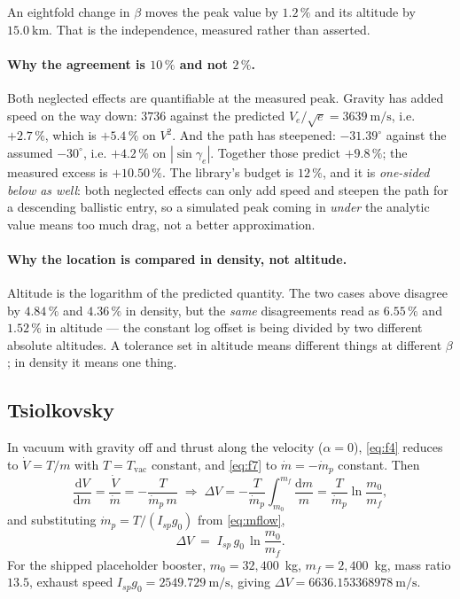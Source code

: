 \documentclass[11pt]{article}
\newcommand{\dd}{\mathrm{d}}
\begin{document}
An eightfold change in $\beta$ moves the peak value by $1.2\,\%$ and its
altitude by $15.0~\mathrm{km}$. That is the independence, measured rather than
asserted.

\paragraph{Why the agreement is $10\,\%$ and not $2\,\%$.} Both neglected
effects are quantifiable at the measured peak. Gravity has added speed on the
way down: $3736$ against the predicted $V_e/\sqrt{e} = 3639~\mathrm{m/s}$, i.e.
$+2.7\,\%$, which is $+5.4\,\%$ on $V^2$. And the path has steepened:
$-31.39^{\circ}$ against the assumed $-30^{\circ}$, i.e. $+4.2\,\%$ on
$|\sin\gamma_e|$. Together those predict $+9.8\,\%$; the measured excess is
$+10.50\,\%$. The library's budget is $12\,\%$, and it is \emph{one-sided below
as well}: both neglected effects can only add speed and steepen the path for a
descending ballistic entry, so a simulated peak coming in \emph{under} the
analytic value means too much drag, not a better approximation.

\paragraph{Why the location is compared in density, not altitude.} Altitude is
the logarithm of the predicted quantity. The two cases above disagree by
$4.84\,\%$ and $4.36\,\%$ in density, but the \emph{same} disagreements read as
$6.55\,\%$ and $1.52\,\%$ in altitude --- the constant log offset is being
divided by two different absolute altitudes. A tolerance set in altitude means
different things at different $\beta$; in density it means one thing.

\subsection{Tsiolkovsky}
\label{sec:tsiolkovsky}

In vacuum with gravity off and thrust along the velocity ($\alpha=0$),
\eqref{eq:f4} reduces to $\dot V = T/m$ with $T = T_{\text{vac}}$ constant, and
\eqref{eq:f7} to $\dot m = -\dot m_p$ constant. Then
\begin{equation}
  \frac{\dd V}{\dd m} = \frac{\dot V}{\dot m}
  = -\frac{T}{\dot m_p\,m}
  \;\Longrightarrow\;
  \Delta V = -\frac{T}{\dot m_p}\int_{m_0}^{m_f}\frac{\dd m}{m}
  = \frac{T}{\dot m_p}\ln\frac{m_0}{m_f} ,
\end{equation}
and substituting $\dot m_p = T/(I_{sp}g_0)$ from \eqref{eq:mflow},
\begin{equation}
  \Delta V \;=\; I_{sp}\,g_0\,\ln\frac{m_0}{m_f} .
  \label{eq:tsiolkovsky}
\end{equation}
For the shipped placeholder booster, $m_0 = 32{,}400$~kg,
$m_f = 2{,}400$~kg, mass ratio $13.5$, exhaust speed
$I_{sp}g_0 = 2549.729~\mathrm{m/s}$, giving
$\Delta V = 6636.153368978~\mathrm{m/s}$.
\end{document}
